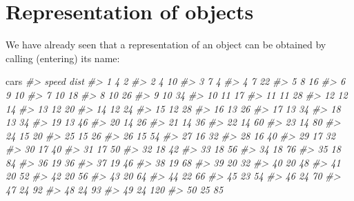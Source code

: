 \documentclass[
]{book}
\newenvironment{Shaded}{\begin{snugshade}}{\end{snugshade}}
\newcommand{\CommentTok}[1]{\textcolor[rgb]{0.56,0.35,0.01}{\textit{#1}}}
\newcommand{\NormalTok}[1]{#1}
\begin{document}
\section{Representation of objects}\label{representation-of-objects}

We have already seen that a representation of an object can be obtained by calling (entering) its name:

\begin{Shaded}
\begin{Highlighting}[]
\NormalTok{cars}
\CommentTok{\#\textgreater{}    speed dist}
\CommentTok{\#\textgreater{} 1      4    2}
\CommentTok{\#\textgreater{} 2      4   10}
\CommentTok{\#\textgreater{} 3      7    4}
\CommentTok{\#\textgreater{} 4      7   22}
\CommentTok{\#\textgreater{} 5      8   16}
\CommentTok{\#\textgreater{} 6      9   10}
\CommentTok{\#\textgreater{} 7     10   18}
\CommentTok{\#\textgreater{} 8     10   26}
\CommentTok{\#\textgreater{} 9     10   34}
\CommentTok{\#\textgreater{} 10    11   17}
\CommentTok{\#\textgreater{} 11    11   28}
\CommentTok{\#\textgreater{} 12    12   14}
\CommentTok{\#\textgreater{} 13    12   20}
\CommentTok{\#\textgreater{} 14    12   24}
\CommentTok{\#\textgreater{} 15    12   28}
\CommentTok{\#\textgreater{} 16    13   26}
\CommentTok{\#\textgreater{} 17    13   34}
\CommentTok{\#\textgreater{} 18    13   34}
\CommentTok{\#\textgreater{} 19    13   46}
\CommentTok{\#\textgreater{} 20    14   26}
\CommentTok{\#\textgreater{} 21    14   36}
\CommentTok{\#\textgreater{} 22    14   60}
\CommentTok{\#\textgreater{} 23    14   80}
\CommentTok{\#\textgreater{} 24    15   20}
\CommentTok{\#\textgreater{} 25    15   26}
\CommentTok{\#\textgreater{} 26    15   54}
\CommentTok{\#\textgreater{} 27    16   32}
\CommentTok{\#\textgreater{} 28    16   40}
\CommentTok{\#\textgreater{} 29    17   32}
\CommentTok{\#\textgreater{} 30    17   40}
\CommentTok{\#\textgreater{} 31    17   50}
\CommentTok{\#\textgreater{} 32    18   42}
\CommentTok{\#\textgreater{} 33    18   56}
\CommentTok{\#\textgreater{} 34    18   76}
\CommentTok{\#\textgreater{} 35    18   84}
\CommentTok{\#\textgreater{} 36    19   36}
\CommentTok{\#\textgreater{} 37    19   46}
\CommentTok{\#\textgreater{} 38    19   68}
\CommentTok{\#\textgreater{} 39    20   32}
\CommentTok{\#\textgreater{} 40    20   48}
\CommentTok{\#\textgreater{} 41    20   52}
\CommentTok{\#\textgreater{} 42    20   56}
\CommentTok{\#\textgreater{} 43    20   64}
\CommentTok{\#\textgreater{} 44    22   66}
\CommentTok{\#\textgreater{} 45    23   54}
\CommentTok{\#\textgreater{} 46    24   70}
\CommentTok{\#\textgreater{} 47    24   92}
\CommentTok{\#\textgreater{} 48    24   93}
\CommentTok{\#\textgreater{} 49    24  120}
\CommentTok{\#\textgreater{} 50    25   85}
\end{Highlighting}
\end{Shaded}
\end{document}
